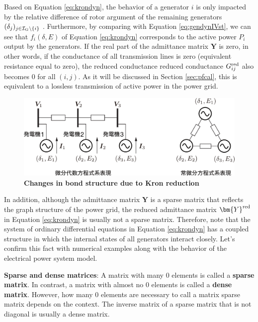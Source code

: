 \documentclass[graybox, envcountchap]{svmult}
\begin{document}
Based on Equation \ref{eq:krondyn}, the behavior of a generator $i$ is only
impacted by the relative difference of rotor argument of the remaining
generators $(\delta_j)_{j\in \mathcal{I}_{\rm G}\setminus \{i\}}$ . Furthermore,
by comparing with Equation \ref{eq:gendynIVst}, we can see that $f_i(\delta,E)$
of Equation \ref{eq:krondyn} corresponds to the active power $P_i$ output by the
generators. If the real part of the admittance matrix $\bm{Y}$ is zero, in other
words, if the conductance of all transmission lines is zero (equivalent
resistance equal to zero), the reduced conductance reduced conductance
$G_{ij}^{\rm red} $ also becomes 0 for all $(i,j)$. As it will be discussed in
Section \ref{sec:pfcal}, this is equivalent to a lossless transmission of active
power in the power grid.

\begin{figure}[t]
\centering
\includegraphics[width = .85\linewidth]{figs/kronredgen}
\medskip
\caption{\textbf{Changes in bond structure due to Kron reduction}}
\label{fig:krongen}
\medskip
\end{figure}


In addition, although the admittance matrix $\bm{Y}$ is a sparse matrix that
reflects the graph structure of the power grid, the reduced admittance matrix
$\bm{Y}^{\rm red}$ in Equation \ref{eq:krondyn} is usually not a sparse matrix.
Therefore, note that the system of ordinary differential equations in Equation
\ref{eq:krondyn} has a coupled structure in which the internal states of all
generators interact closely.  Let's confirm this fact with numerical examples
along with the behavior of the electrical power system model.

\begin{COLUMN}
\noindent \textbf{Sparse and dense matrices}:
A matrix with many 0 elements is called a \textbf{sparse matrix}. In contrast, a
matrix with almost no 0 elements is called a \textbf{dense matrix}. However, how
many 0 elements are necessary to call a matrix sparse matrix depends on the
context. The inverse matrix of a sparse matrix that is not diagonal is usually a
dense matrix.
\end{COLUMN}
\end{document}
